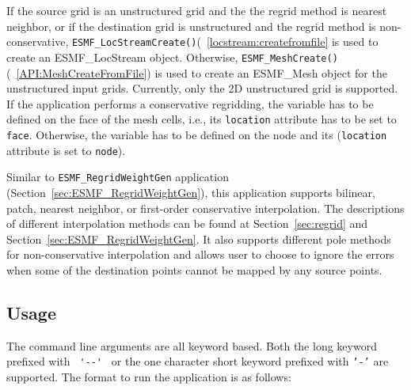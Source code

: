 If the source grid is an unstructured grid and the the regrid method is nearest neighbor, or if the destination grid 
is unstructured and the regrid method is non-conservative, {\tt ESMF\_LocStreamCreate()}(~\ref{locstream:createfromfile} is used to create an ESMF_LocStream object.  Otherwise,
{\tt ESMF\_MeshCreate()}(~\ref{API:MeshCreateFromFile}) is used to create an ESMF\_Mesh object for the unstructured 
input grids.  Currently, only the 2D unstructured grid is supported.
If the application performs a conservative regridding, the variable has to be defined on the face of the mesh cells, i.e., its {\tt location} attribute has to be set to {\tt face}.  Otherwise, the variable has to be 
defined on the node and its ({\tt location} attribute is set to {\tt node}).

Similar to {\tt ESMF\_RegridWeightGen} application (Section~\ref{sec:ESMF_RegridWeightGen}), this application supports
bilinear, patch, nearest neighbor, or first-order conservative interpolation. The descriptions of different 
interpolation methods can be found at Section~\ref{sec:regrid} and Section~\ref{sec:ESMF_RegridWeightGen}. 
It also supports different pole methods for non-conservative interpolation and allows user to choose to 
ignore the errors when some of the destination points cannot be mapped by any source points. 

\subsection{Usage}\label{sec:fileregridusage}

The command line arguments are all keyword based.  Both the long keyword prefixed with \verb+ '--' + or the
one character short keyword prefixed with {\tt '-'} are supported.  The format to run the application is
as follows:

